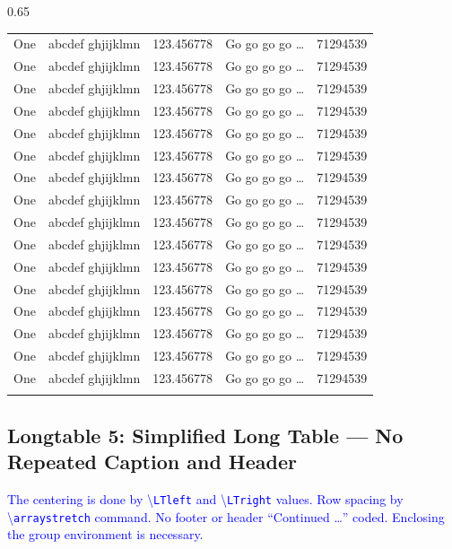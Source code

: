 \documentclass[phd,showframe]{ndsu-thesis-2022}
\newcommand\italk[1]{\textcolor{blue}{#1}}  %
\newcommand\cmd[1]{\textbackslash\texttt{#1}}  %
\begin{document}
\begin{spacing}{0.65}
\begin{longtable}{@{\:} p{1in} p{1.45in} p{1in} p{1.3in} p{1in} @{\:}}
One & abcdef ghjijklmn & 123.456778  & Go go go go \ldots & \num{71294539}\\
One & abcdef ghjijklmn & 123.456778  & Go go go go \ldots & \num{71294539}\\
One & abcdef ghjijklmn & 123.456778  & Go go go go \ldots & \num{71294539}\\
One & abcdef ghjijklmn & 123.456778  & Go go go go \ldots & \num{71294539}\\
One & abcdef ghjijklmn & 123.456778  & Go go go go \ldots & \num{71294539}\\
One & abcdef ghjijklmn & 123.456778  & Go go go go \ldots & \num{71294539}\\
One & abcdef ghjijklmn & 123.456778  & Go go go go \ldots & \num{71294539}\\
One & abcdef ghjijklmn & 123.456778  & Go go go go \ldots & \num{71294539}\\
One & abcdef ghjijklmn & 123.456778  & Go go go go \ldots & \num{71294539}\\
One & abcdef ghjijklmn & 123.456778  & Go go go go \ldots & \num{71294539}\\
One & abcdef ghjijklmn & 123.456778  & Go go go go \ldots & \num{71294539}\\
One & abcdef ghjijklmn & 123.456778  & Go go go go \ldots & \num{71294539}\\
One & abcdef ghjijklmn & 123.456778  & Go go go go \ldots & \num{71294539}\\
One & abcdef ghjijklmn & 123.456778  & Go go go go \ldots & \num{71294539}\\
One & abcdef ghjijklmn & 123.456778  & Go go go go \ldots & \num{71294539}\\
One & abcdef ghjijklmn & 123.456778  & Go go go go \ldots & \num{71294539}\\
\bottomrule
\label{lt:sim}
\end{longtable}
\end{spacing}
\endgroup


\subsection{Longtable 5: Simplified Long Table --- No Repeated Caption and Header}

\italk{The centering is done by \cmd{LTleft} and \cmd{LTright} values. Row spacing by \\\cmd{arraystretch} command. No footer or header ``Continued \ldots'' coded. Enclosing the group environment is necessary.}
\end{document}

